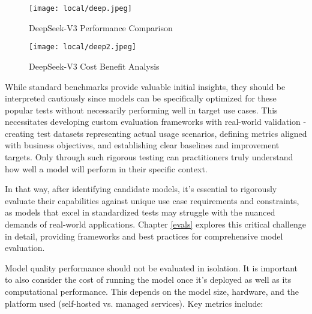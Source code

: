 \begin{figure}[H]
\centering
\texttt{[image: local/deep.jpeg]}
\caption{DeepSeek-V3 Performance Comparison}
\label{fig:deep}
\end{figure}

\begin{figure}[H]
\centering
\texttt{[image: local/deep2.jpeg]}
\caption{DeepSeek-V3 Cost Benefit Analysis}
\label{fig:deep2}
\end{figure}

While standard benchmarks provide valuable initial insights, they should be interpreted cautiously since models can be specifically optimized for these popular tests without necessarily performing well in target use cases. This necessitates developing custom evaluation frameworks with real-world validation - creating test datasets representing actual usage scenarios, defining metrics aligned with business objectives, and establishing clear baselines and improvement targets. Only through such rigorous testing can practitioners truly understand how well a model will perform in their specific context.

In that way, after identifying candidate models, it's essential to rigorously evaluate their capabilities against unique use case requirements and constraints, as models that excel in standardized tests may struggle with the nuanced demands of real-world applications. Chapter \ref{evals} explores this critical challenge in detail, providing frameworks and best practices for comprehensive model evaluation.

Model quality performance should not be evaluated in isolation. It is important to also consider the cost of running the model once it's deployed as well as its computational performance. This depends on the model size, hardware, and the platform used (self-hosted vs. managed services). Key metrics include:

